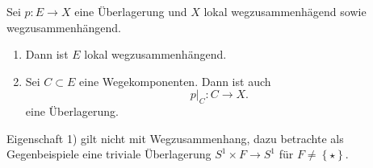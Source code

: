 \begin{theorem}\label{thm:überlagerung-über-lokal-wegzusammenhängendem-raum-zerfällt-in-wegzusammenhängende-komponenten-von-e}
    Sei $p\colon E\to X$ eine Überlagerung und $X$ lokal wegzusammenhägend sowie wegzusammenhängend.
    \begin{enumerate}[1)]
        \item Dann ist $E$ lokal wegzusammenhängend. 
        \item Sei $C\subset E$ eine Wegekomponenten. Dann ist auch
            \[
            p|_C \colon  C \to X
            .\] 
            eine Überlagerung.
    \end{enumerate}
\end{theorem}

\begin{oral}
    Eigenschaft 1) gilt nicht mit Wegzusammenhang, dazu betrachte als Gegenbeispiele eine triviale Überlagerung $S^1 \times F \to  S^1$ für $F\neq \left \{\star\right\} $.
\end{oral}

